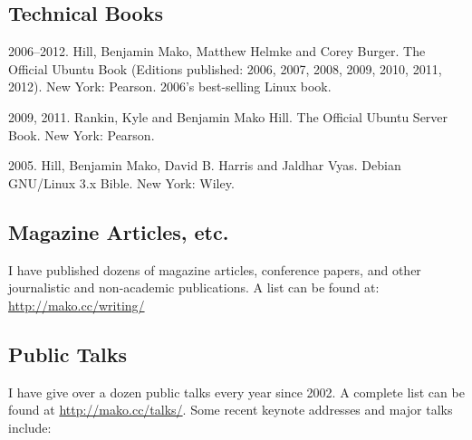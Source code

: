 \documentclass[10pt]{article}
\newenvironment{cvlist}{
\begin{list}{}{\leftmargin=3.0em \itemindent=-3.0em}
  \setlength{\itemsep}{0pt}
  \setlength{\parskip}{0em}
  \setlength{\parsep}{1em}
  \setlength{\parindent}{0em}}
{\vspace{1em}
\end{list}}
\begin{document}
\subsection{Technical Books}
\begin{cvlist}
\item 2006--2012. Hill, Benjamin Mako, Matthew Helmke and Corey
  Burger. The Official Ubuntu Book (Editions published: 2006, 2007,
  2008, 2009, 2010, 2011, 2012). New York: Pearson. 2006's best-selling Linux book.
\item 2009, 2011. Rankin, Kyle and Benjamin Mako Hill. The Official Ubuntu
  Server Book. New York: Pearson.
\item 2005. Hill, Benjamin Mako, David B. Harris and Jaldhar
  Vyas. Debian GNU/Linux 3.x Bible. New York: Wiley.
\end{cvlist}

\subsection{Magazine Articles, etc.}
I have published dozens of magazine articles, conference papers, and
other journalistic and non-academic publications. A list can be found
at: \url{http://mako.cc/writing/}

\vspace{2.5em}

\subsection{Public Talks}
I have give over a dozen public talks every year since 2002. A
complete list can be found at \url{http://mako.cc/talks/}. Some recent
keynote addresses and major talks include:
\end{document}
